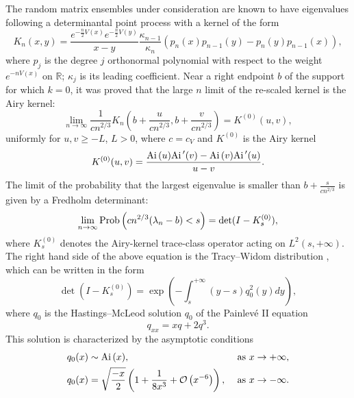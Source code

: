 \documentclass[11pt,fleqn]{article}
\numberwithin{equation}{section}
\def\Ai{{\rm Ai \,}}
\def\bigO{{\cal O}}
\begin{document}
The random matrix ensembles under consideration are known to have eigenvalues following a determinantal point process with a kernel of the form \cite{Deift}
\begin{equation} \label{kernel}
    K_n(x,y)
        =\frac{e^{-\frac{n}{2}V(x)}
e^{-\frac{n}{2}V(y)}}{x-y}\frac{\kappa_{n-1}}{\kappa_{n}}
(p_n(x)p_{n-1}(y)-p_n(y)p_{n-1}(x)),
\end{equation}
where $p_j$ is the degree $j$ orthonormal polynomial with
respect to the weight $e^{-nV(x)}$ on $\mathbb R$; $\kappa_j$ is its
leading coefficient. Near a right endpoint $b$ of the support for
which $k=0$, it was proved \cite{DKMVZ2, DG} that the large $n$ limit of the
re-scaled kernel is the Airy kernel:
\begin{equation}\label{Airykernel}
\lim_{n\to\infty}\frac{1}{cn^{2/3}}K_n\left(b+\frac{u}{cn^{2/3}},
b+\frac{v}{cn^{2/3}}\right)=K^{(0)}(u,v),
\end{equation}
uniformly for $u,v\geq -L$, $L>0$, where $c=c_V$ and $K^{(0)}$ is
the Airy kernel
\begin{equation}\label{kernel1}
K^{(0)}(u,v)=\frac{\Ai(u)\Ai'(v)-\Ai(v)\Ai'(u)}{u-v}.
\end{equation}
The limit of the probability that the largest eigenvalue is smaller
than $b+\frac{s}{cn^{2/3}}$ is given by a Fredholm determinant:
\begin{equation}\label{TW0}
\lim_{n\to\infty}{\rm
Prob}\left(cn^{2/3}(\lambda_n-b)<s\right)=\det(I-K_s^{(0)}),
\end{equation}
where $K_s^{(0)}$ denotes the Airy-kernel trace-class operator
acting on $L^2(s,+\infty)$. The right hand side of the above
equation is the Tracy--Widom distribution \cite{TW}, which can be written in
the form
\begin{equation}\label{TW}
\det(I-K_s^{(0)})=\exp\left(-\int_s^{+\infty}(y-s)q_0^2(y)dy\right),
\end{equation}
where $q_0$ is the Hastings--McLeod solution $q_0$ of the Painlev\'e
II equation
\begin{equation}\label{PII0}
q_{xx}=xq+2q^3.
\end{equation}
This solution \cite{HM} is characterized by the asymptotic
conditions
\begin{align}&\label{HastingsMcLeod}
q_0(x)\sim \Ai(x), &\mbox{ as $x\to +\infty$,}\\
&\label{HastingsMcLeod2}q_0(x)= \sqrt\frac{-x}{2}\left(1 +
\frac{1}{8x^{3}} + \bigO\left(x^{-6}\right)\right), &\mbox{ as $x\to
-\infty$.}
\end{align}
\end{document}
